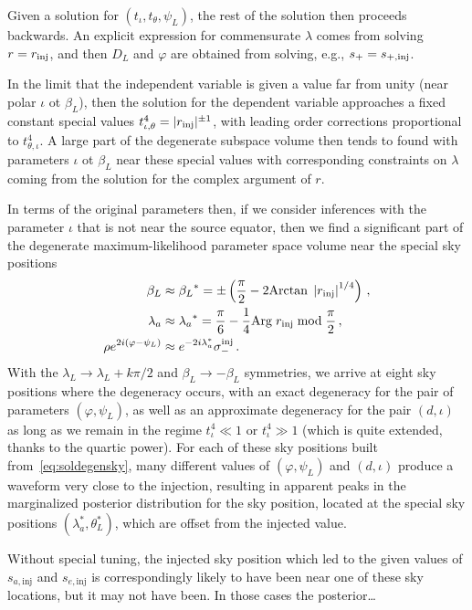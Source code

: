 \documentclass[aps,showpacs,twocolumn,prd,superscriptaddress,nofootinbib]{revtex4-1}
\newcommand{\bsub}{\begin{subequations}}
\newcommand{\esub}{\end{subequations}}
\newcommand\betaL{{\beta_{L}}}
\newcommand\lambdaL{{\lambda_{L}}}
\newcommand\psiL{{\psi_{L}}}
\begin{document}
Given a solution for $(t_\iota,t_\theta,\psi_L)$, the rest of the solution then proceeds backwards. An explicit expression for commensurate $\lambda$ comes from solving $r=r_{\rm inj}$, and then $D_L$ and $\varphi$ are obtained from solving, e.g., $s_+=s_{+,{\rm inj}}$.

In the limit that the independent variable is given a value far from unity (near polar $\iota$ ot $\beta_L$), then the solution for the dependent variable approaches a fixed constant special values $t_{\iota,\theta}^4={|r_{\rm inj}|^{\pm1}}$, with leading order corrections proportional to  $t_{\theta,\iota}^{4}$.  A large part of the degenerate subspace volume then tends to found with parameters $\iota$ ot $\beta_L$ near these special values with corresponding constraints on $\lambda$ coming from the solution for the complex argument of $r$.

In terms of the original parameters then, if we consider inferences with the parameter $\iota$ that is not near the source equator, then we find a significant part of the degenerate maximum-likelihood parameter space volume near the special sky positions
\bsub
\begin{align}
  \beta_L&\approx{\beta_L}^{*}=\pm\left(\frac{\pi}{2} - 2 \mathrm{Arctan} \; \left| r_{\rm inj}\right|^{1/4} \right)\,, \\
  \lambda_a&\approx {\lambda_a}^{*}=\frac{\pi}{6} -\frac{1}{4} \mathrm{Arg} \; r_{\rm inj} \;\mathrm{mod}\; \frac{\pi}{2} \,,\\
  \rho e^{2i(\varphi-\psiL)} &\approx e^{-2i\lambda_{a}^{*}} \sigma_{-}^{\rm inj} \,.
\end{align}
\esub
With the $\lambdaL \rightarrow \lambdaL + k \pi/2$ and $\betaL \rightarrow - \betaL$ symmetries, we arrive at eight sky positions where the degeneracy occurs, with an exact degeneracy for the pair of parameters $(\varphi, \psiL)$, as well as an approximate degeneracy for the pair $(d, \iota)$ as long as we remain in the regime $t_{\iota}^{4} \ll 1$ or $t_{\iota}^{4} \gg 1$ (which is quite extended, thanks to the quartic power). For each of these sky positions built from~\eqref{eq:soldegensky}, many different values of $(\varphi, \psiL)$ and $(d, \iota)$ produce a waveform very close to the injection, resulting in apparent peaks in the marginalized posterior distribution for the sky position, located at the special sky positions $(\lambda_{a}^{*}, \theta_{L}^{*})$, which are offset from the injected value.

Without special tuning, the injected sky position which led to the given values of $s_{a,\mathrm{inj}}$ and $s_{e,\mathrm{inj}}$ is correspondingly likely to have been near one of these sky locations, but it may not have been. In those cases the posterior\ldots
\end{document}
